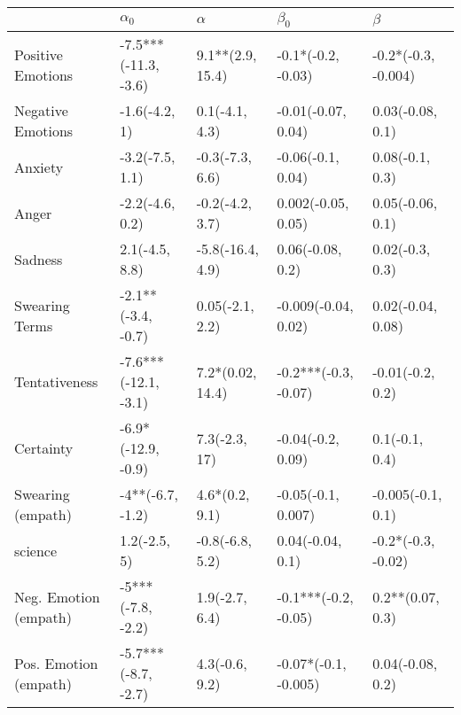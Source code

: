 \begin{tabular}{lllll}
\toprule
{} &            $\alpha_0$ &          $\alpha$ &             $\beta_0$ &              $\beta$ \\
\midrule
Positive Emotions     &  -7.5***(-11.3, -3.6) &  9.1**(2.9, 15.4) &    -0.1*(-0.2, -0.03) &  -0.2*(-0.3, -0.004) \\
Negative Emotions     &         -1.6(-4.2, 1) &    0.1(-4.1, 4.3) &    -0.01(-0.07, 0.04) &     0.03(-0.08, 0.1) \\
Anxiety               &       -3.2(-7.5, 1.1) &   -0.3(-7.3, 6.6) &     -0.06(-0.1, 0.04) &      0.08(-0.1, 0.3) \\
Anger                 &       -2.2(-4.6, 0.2) &   -0.2(-4.2, 3.7) &    0.002(-0.05, 0.05) &     0.05(-0.06, 0.1) \\
Sadness               &        2.1(-4.5, 8.8) &  -5.8(-16.4, 4.9) &      0.06(-0.08, 0.2) &      0.02(-0.3, 0.3) \\
Swearing Terms        &    -2.1**(-3.4, -0.7) &   0.05(-2.1, 2.2) &   -0.009(-0.04, 0.02) &    0.02(-0.04, 0.08) \\
Tentativeness         &  -7.6***(-12.1, -3.1) &  7.2*(0.02, 14.4) &  -0.2***(-0.3, -0.07) &     -0.01(-0.2, 0.2) \\
Certainty             &    -6.9*(-12.9, -0.9) &     7.3(-2.3, 17) &     -0.04(-0.2, 0.09) &       0.1(-0.1, 0.4) \\
Swearing (empath)     &      -4**(-6.7, -1.2) &    4.6*(0.2, 9.1) &    -0.05(-0.1, 0.007) &    -0.005(-0.1, 0.1) \\
science               &          1.2(-2.5, 5) &   -0.8(-6.8, 5.2) &      0.04(-0.04, 0.1) &   -0.2*(-0.3, -0.02) \\
Neg. Emotion (empath) &     -5***(-7.8, -2.2) &    1.9(-2.7, 6.4) &  -0.1***(-0.2, -0.05) &     0.2**(0.07, 0.3) \\
Pos. Emotion (empath) &   -5.7***(-8.7, -2.7) &    4.3(-0.6, 9.2) &  -0.07*(-0.1, -0.005) &     0.04(-0.08, 0.2) \\
\bottomrule
\end{tabular}
